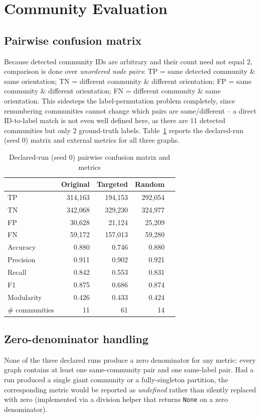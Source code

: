 \documentclass[10pt,conference]{IEEEtran}
\begin{document}
\section{Community Evaluation}
\label{sec:eval}

\subsection{Pairwise confusion matrix}
Because detected community IDs are arbitrary and their count need not equal 2, comparison is done
over \emph{unordered node pairs}: TP = same detected community \& same orientation; TN = different
community \& different orientation; FP = same community \& different orientation; FN = different
community \& same orientation. This sidesteps the label-permutation problem completely, since
renumbering communities cannot change which pairs are same/different -- a direct ID-to-label match
is not even well defined here, as there are 11 detected communities but only 2 ground-truth labels.
Table~\ref{tab:conf} reports the declared-run (seed 0) matrix and external metrics for all three
graphs.

\begin{table}[h]
\centering
\caption{Declared-run (seed 0) pairwise confusion matrix and metrics}
\label{tab:conf}
\small
\begin{tabular}{@{}lrrrr@{}}
\toprule
 & Original & Targeted & Random \\
\midrule
TP & 314{,}163 & 194{,}153 & 292{,}054 \\
TN & 342{,}068 & 329{,}230 & 324{,}977 \\
FP & 30{,}628 & 21{,}124 & 25{,}209 \\
FN & 59{,}172 & 157{,}013 & 59{,}280 \\
Accuracy & 0.880 & 0.746 & 0.880 \\
Precision & 0.911 & 0.902 & 0.921 \\
Recall & 0.842 & 0.553 & 0.831 \\
F1 & 0.875 & 0.686 & 0.874 \\
Modularity & 0.426 & 0.433 & 0.424 \\
\# communities & 11 & 61 & 14 \\
\bottomrule
\end{tabular}
\end{table}

\subsection{Zero-denominator handling}
None of the three declared runs produce a zero denominator for any metric: every graph contains at
least one same-community pair and one same-label pair. Had a run produced a single giant community
or a fully-singleton partition, the corresponding metric would be reported as \emph{undefined}
rather than silently replaced with zero (implemented via a division helper that returns \texttt{None}
on a zero denominator).
\end{document}
